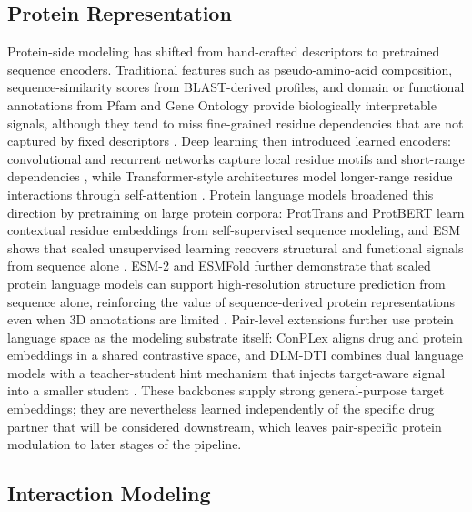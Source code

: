 \subsection{Protein Representation}

Protein-side modeling has shifted from hand-crafted descriptors to pretrained sequence encoders. Traditional
features such as pseudo-amino-acid composition, sequence-similarity scores from BLAST-derived profiles, and
domain or functional annotations from Pfam and Gene Ontology provide biologically interpretable signals,
although they tend to miss fine-grained residue dependencies that are not captured by fixed descriptors
\citep{chou2001pseaac,altschul1997psiblast,finn2014pfam,ashburner2000go,dubchak1995global}. Deep learning
then introduced learned encoders: convolutional and recurrent networks capture local residue motifs and
short-range dependencies \citep{lee2019deepconv,karimi2019deepaffinity}, while Transformer-style
architectures model longer-range residue interactions through self-attention
\citep{chen2020transformercpi}. Protein language models broadened this direction by pretraining on large
protein corpora: ProtTrans and ProtBERT learn contextual residue embeddings from self-supervised sequence
modeling, and ESM shows that scaled unsupervised learning recovers structural and functional signals from
sequence alone \citep{elnaggar2021prottrans,rives2021esm}. ESM-2 and ESMFold further demonstrate that
scaled protein language models can support high-resolution structure prediction from sequence alone,
reinforcing the value of sequence-derived protein representations even when 3D annotations are limited
\citep{lin2023esm2}. Pair-level extensions further use protein language space as the modeling substrate
itself: ConPLex aligns drug and protein embeddings in a shared contrastive space, and DLM-DTI combines dual
language models with a teacher-student hint mechanism that injects target-aware signal into a smaller
student \citep{singh2023complex,lee2024dlmdti}. These backbones supply strong general-purpose target
embeddings; they are nevertheless learned independently of the specific drug partner that will be considered
downstream, which leaves pair-specific protein modulation to later stages of the pipeline.

\subsection{Interaction Modeling}

